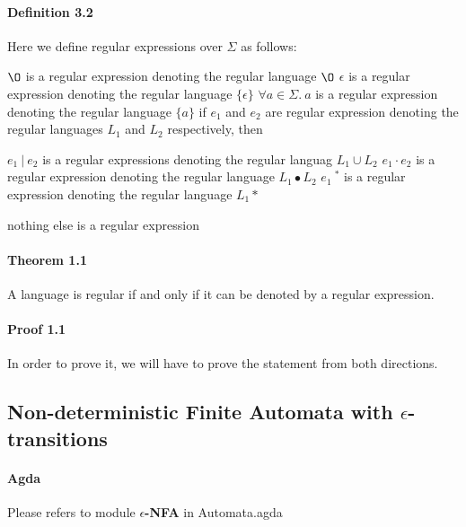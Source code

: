 \documentclass[twoside,openright,final]{bhamthesis}
\renewcommand{\item}{\itemindent0.5cm\itemold}
\begin{document}
\paragraph{Definition 3.2} Here we define regular expressions over
\(\Sigma\) as follows: 
\begin{enumerate}
  \item \(\O\) is a regular expression denoting the regular language \(\O\)
  \item \(\epsilon\) is a regular expression denoting the regular language \(\{\epsilon\}\)
  \item \(\forall a\in\Sigma.\ a\) is a regular expression denoting the regular language \(\{a\}\)
  \item if \(e_{1}\) and \(e_{2}\) are regular expression denoting the regular
    languages \(L_1\) and \(L_2\) respectively, then
    \begin{enumerate}
      \item \(e_{1}\ |\ e_{2}\) is a regular expressions denoting the
        regular languag \(L_1 \cup L_2\)
      \item \(e_{1}\cdot e_{2}\) is a regular expression denoting the
        regular language \(L_1\bullet L_2\)
      \item \(e_{1}\ ^{*}\) is a regular expression denoting the regular
        language \(L_1\ast\) 
     \end{enumerate}
  \item nothing else is a regular expression 
\end{enumerate}

\paragraph{Theorem 1.1} A language is regular if and only if it can be
denoted by a regular expression. 

\paragraph{Proof 1.1} In order to prove it, we will have to prove
the statement from both directions. 


\subsection{Non-deterministic Finite Automata with
  \(\epsilon\)-transitions}
\paragraph{Agda} Please refers to module \textbf{\(\epsilon\)-NFA} in
Automata.agda \\
\end{document}
